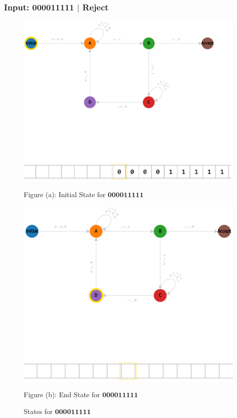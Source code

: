 \vspace*{\fill}
\newpage
\vspace*{\fill}

\subsubsection*{Input: 000011111 $|$ Reject}
\label{q1-000011111}

\begin{figure}[ht]
  \centering
  \begin{minipage}{.49\linewidth}
    \centering
    \includegraphics[width=\linewidth]{answers/img/q1-000011111-initial.png}
    \caption*{Figure (a): Initial State for $\mathbf{000011111}$}
    \label{fig:000011111-initial}
  \end{minipage}
  \begin{minipage}{.49\linewidth}
    \centering
    \includegraphics[width=\linewidth]{answers/img/q1-000011111-end.png}
    \caption*{Figure (b): End State for $\mathbf{000011111}$}
    \label{fig:000011111-end}
  \end{minipage}
  \caption{States for $\mathbf{000011111}$}
  \label{fig:in-000011111}
\end{figure}

